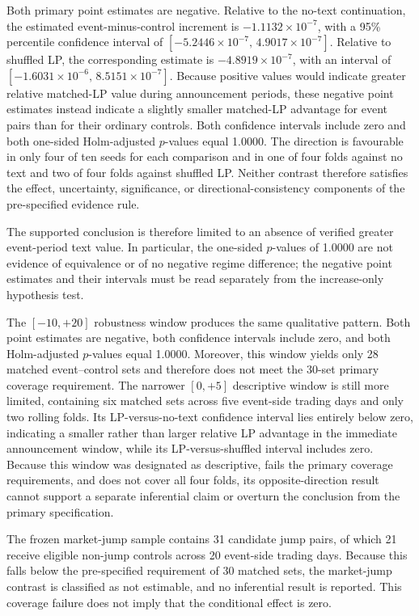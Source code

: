 Both primary point estimates are negative.  Relative to the no-text
continuation, the estimated event-minus-control increment is
$-1.1132\times10^{-7}$, with a 95\% percentile confidence interval of
$[-5.2446\times10^{-7},\,4.9017\times10^{-7}]$.  Relative to shuffled LP, the
corresponding estimate is $-4.8919\times10^{-7}$, with an interval of
$[-1.6031\times10^{-6},\,8.5151\times10^{-7}]$.  Because positive values would
indicate greater relative matched-LP value during announcement periods, these
negative point estimates instead indicate a slightly smaller matched-LP
advantage for event pairs than for their ordinary controls.  Both confidence
intervals include zero and both one-sided Holm-adjusted $p$-values equal
1.0000.  The direction is favourable in only four of ten seeds for each
comparison and in one of four folds against no text and two of four folds
against shuffled LP.  Neither contrast therefore satisfies the effect,
uncertainty, significance, or directional-consistency components of the
pre-specified evidence rule.

The supported conclusion is therefore limited to an absence of verified
greater event-period text value.  In particular, the one-sided $p$-values of
1.0000 are not evidence of equivalence or of no negative regime difference;
the negative point estimates and their intervals must be read separately
from the increase-only hypothesis test.

The $[-10,+20]$ robustness window produces the same qualitative pattern.  Both
point estimates are negative, both confidence intervals include zero, and both
Holm-adjusted $p$-values equal 1.0000.  Moreover, this window yields only 28
matched event--control sets and therefore does not meet the 30-set primary
coverage requirement.  The narrower $[0,+5]$ descriptive window is still more
limited, containing six matched sets across five event-side trading days and only
two rolling folds.  Its LP-versus-no-text confidence interval lies entirely
below zero, indicating a smaller rather than larger relative LP advantage in
the immediate announcement window, while its LP-versus-shuffled interval
includes zero.  Because this window was designated as descriptive, fails the
primary coverage requirements, and does not cover all four folds, its
opposite-direction result cannot support a separate inferential claim or
overturn the conclusion from the primary specification.



The frozen market-jump sample contains 31 candidate jump pairs, of which 21
receive eligible non-jump controls across 20 event-side trading days.  Because
this falls below the pre-specified requirement of 30 matched sets, the
market-jump contrast is classified as not estimable, and no inferential result
is reported.  This coverage failure does not imply that the conditional effect
is zero.


